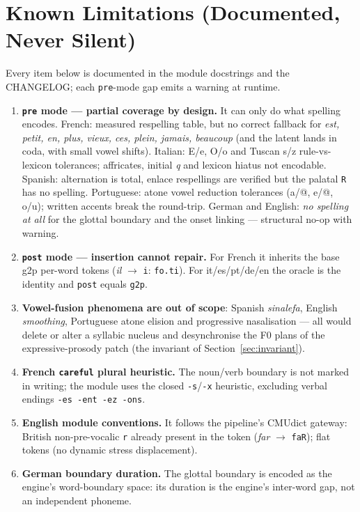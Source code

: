 \documentclass[11pt,a4paper]{report}
\newcommand{\smp}[1]{\texttt{#1}}          %
\begin{document}
\chapter{Known Limitations (Documented, Never Silent)}

Every item below is documented in the module docstrings and the CHANGELOG;
each \smp{pre}-mode gap emits a warning at runtime.

\begin{enumerate}
  \item \textbf{\smp{pre} mode — partial coverage by design.} It can only
        do what spelling encodes. French: measured respelling table, but no
        correct fallback for \emph{est, petit, en, plus, vieux, ces, plein,
        jamais, beaucoup} (and the latent lands in coda, with small vowel
        shifts). Italian: E/e, O/o and Tuscan s/z rule-vs-lexicon
        tolerances; affricates, initial \emph{q} and lexicon hiatus not
        encodable. Spanish: alternation is total, enlace respellings are
        verified but the palatal \smp{R} has no spelling. Portuguese:
        atone vowel reduction tolerances (a/@, e/@, o/u); written accents
        break the round-trip. German and English: \emph{no spelling at
        all} for the glottal boundary and the onset linking — structural
        no-op with warning.
  \item \textbf{\smp{post} mode — insertion cannot repair.} For French it
        inherits the base g2p per-word tokens (\emph{il}
        $\rightarrow$ \smp{i}: \smp{fo.ti}). For it/es/pt/de/en the oracle
        is the identity and \smp{post} equals \smp{g2p}.
  \item \textbf{Vowel-fusion phenomena are out of scope}: Spanish
        \emph{sinalefa}, English \emph{smoothing}, Portuguese atone elision
        and progressive nasalisation — all would delete or alter a syllabic
        nucleus and desynchronise the F0 plans of the expressive-prosody
        patch (the invariant of Section~\ref{sec:invariant}).
  \item \textbf{French \smp{careful} plural heuristic.} The noun/verb
        boundary is not marked in writing; the module uses the closed
        \smp{-s}/\smp{-x} heuristic, excluding verbal endings
        \smp{-es -ent -ez -ons}.
  \item \textbf{English module conventions.} It follows the pipeline's
        CMUdict gateway: British non-pre-vocalic \smp{r} already present in
        the token (\emph{far} $\rightarrow$ \smp{faR}); flat tokens (no
        dynamic stress displacement).
  \item \textbf{German boundary duration.} The glottal boundary is encoded
        as the engine's word-boundary space: its duration is the engine's
        inter-word gap, not an independent phoneme.
\end{enumerate}
\end{document}
